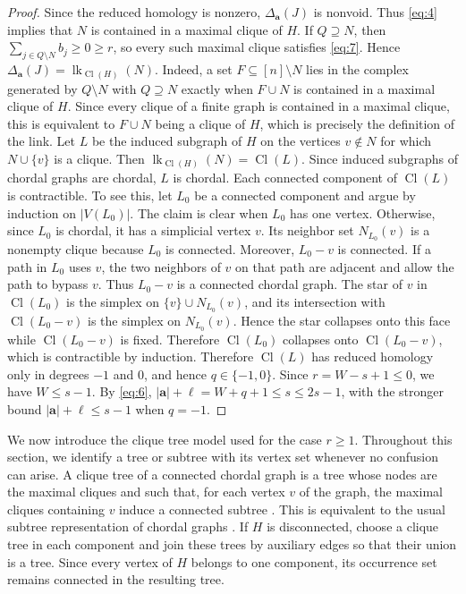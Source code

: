 \documentclass[11pt]{amsart}
\theoremstyle{definition}
\begin{document}
\begin{proof}
Since the reduced homology is nonzero, $\Delta_{\mathbf a}(J)$ is nonvoid. Thus \cref{eq:4} implies that $N$ is contained in a maximal clique of $H$. If $Q\supseteq N$, then $\sum_{j\in Q\setminus N}b_j\ge0\ge r$, so every such maximal clique satisfies \cref{eq:7}. Hence $\Delta_{\mathbf a}(J)=\operatorname{lk}_{\operatorname{Cl}(H)}(N)$. Indeed, a set $F\subseteq[n]\setminus N$ lies in the complex generated by $Q\setminus N$ with $Q\supseteq N$ exactly when $F\cup N$ is contained in a maximal clique of $H$. Since every clique of a finite graph is contained in a maximal clique, this is equivalent to $F\cup N$ being a clique of $H$, which is precisely the definition of the link. Let $L$ be the induced subgraph of $H$ on the vertices $v\notin N$ for which $N\cup\{v\}$ is a clique. Then $\operatorname{lk}_{\operatorname{Cl}(H)}(N)=\operatorname{Cl}(L)$. Since induced subgraphs of chordal graphs are chordal, $L$ is chordal. Each connected component of $\operatorname{Cl}(L)$ is contractible. To see this, let $L_0$ be a connected component and argue by induction on $|V(L_0)|$. The claim is clear when $L_0$ has one vertex. Otherwise, since $L_0$ is chordal, it has a simplicial vertex $v$. Its neighbor set $N_{L_0}(v)$ is a nonempty clique because $L_0$ is connected. Moreover, $L_0-v$ is connected. If a path in $L_0$ uses $v$, the two neighbors of $v$ on that path are adjacent and allow the path to bypass $v$. Thus $L_0-v$ is a connected chordal graph. The star of $v$ in $\operatorname{Cl}(L_0)$ is the simplex on $\{v\}\cup N_{L_0}(v)$, and its intersection with $\operatorname{Cl}(L_0-v)$ is the simplex on $N_{L_0}(v)$. Hence the star collapses onto this face while $\operatorname{Cl}(L_0-v)$ is fixed. Therefore $\operatorname{Cl}(L_0)$ collapses onto $\operatorname{Cl}(L_0-v)$, which is contractible by induction. Therefore $\operatorname{Cl}(L)$ has reduced homology only in degrees $-1$ and $0$, and hence $q\in\{-1,0\}$. Since $r=W-s+1\le0$, we have $W\le s-1$. By \cref{eq:6}, $|\mathbf a|+\ell=W+q+1\le s\le2s-1$, with the stronger bound $|\mathbf a|+\ell\le s-1$ when $q=-1$.
\end{proof}

We now introduce the clique tree model used for the case $r\ge1$. Throughout this section, we identify a tree or subtree with its vertex set whenever no confusion can arise. A clique tree of a connected chordal graph is a tree whose nodes are the maximal cliques and such that, for each vertex $v$ of the graph, the maximal cliques containing $v$ induce a connected subtree \cite{BlairPeyton}. This is equivalent to the usual subtree representation of chordal graphs \cite{Gavril}. If $H$ is disconnected, choose a clique tree in each component and join these trees by auxiliary edges so that their union is a tree. Since every vertex of $H$ belongs to one component, its occurrence set remains connected in the resulting tree.
\end{document}
